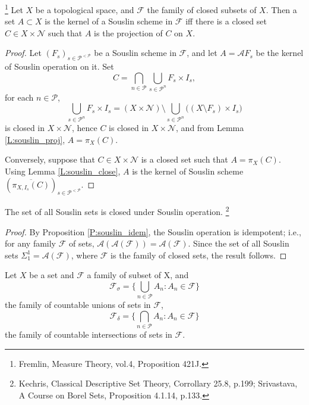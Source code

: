 \begin{proposition} \label{P:souslin_equiv}
\footnote{Fremlin, Measure Theory, vol.4, Proposition 421J.}
Let $X$ be a topological space, and $\mathcal{F}$ the family of closed subsets
of $X$. Then a set $A\subset X$ is the kernel of a Souslin scheme in  
$\mathcal{F}$ iff there is a closed set $C\in X\times\mathcal{N}$ such that $A$
is the projection of $C$ on $X$.
\end{proposition}
\begin{proof}
Let $(F_s)_{s\in\mathcal{P}^{<\mathcal{P}}}$ be a Souslin scheme in
$\mathcal{F}$, and let $A=\mathcal{A} F_s$ be the kernel of Souslin operation 
on it. Set
\[
  C = \bigcap_{n\in\mathcal{P}} \bigcup_{s\in\mathcal{P}^n} F_s \times I_s,
\]
for each $n\in \mathcal{P}$,
\[
  \bigcup_{s\in\mathcal{P}^n} F_s \times I_s
  = (X\times \mathcal{N}) \setminus
    \bigcup_{s\in\mathcal{P}^n} \big( (X\setminus F_s) \times I_s \big)
\]
is closed in $X\times \mathcal{N}$, hence $C$ is closed in 
$X\times\mathcal{N}$, and from Lemma \ref{L:souslin_proj},
$A=\pi_X(C)$.

Conversely, suppose that $C\in X\times\mathcal{N}$ is a closed set such that
$A=\pi_X(C)$. Using Lemma \ref{L:souslin_close}, $A$ is the kernel of Souslin
scheme $(\overline{\pi_{X,I_s}(C)})_{s\in\mathcal{P}^{<\mathcal{P}}}$.
\end{proof}

\begin{proposition} \label{P:souslin_oper}
The set of all Souslin sets is closed under Souslin operation.
  \footnote{
    Kechris, Classical Descriptive Set Theory, Corrollary 25.8, p.199;
    Srivastava, A Course on Borel Sets, Proposition 4.1.14, p.133.}
\end{proposition}
\begin{proof}
By Proposition \ref{P:souslin_idem}, the Souslin operation is idempotent; i.e.,
for any family $\mathcal{F}$ of sets, 
$\mathcal{A}(\mathcal{A}(\mathcal{F})) =\mathcal{A}(\mathcal{F})$. Since the set
of all Souslin sets $\Sigma_1^1=\mathcal{A}(\mathcal{F})$, where $\mathcal{F}$
is the family of closed sets, the result follows.
\end{proof}

Let $X$ be a set and $\mathcal{F}$ a family of subset of X, and
\[
	\mathcal{F}_{\sigma} 
	= \{  
	  \bigcup_{n\in\mathcal{P}} A_n: A_n\in\mathcal{F}
	\}
\]
the family of countable unions of sets in $\mathcal{F}$,
\[
	\mathcal{F}_{\delta} 
	= \{  
	  \bigcap_{n\in\mathcal{P}} A_n: A_n\in\mathcal{F}
	\}
\]
the family of countable intersections of sets in $\mathcal{F}$.

